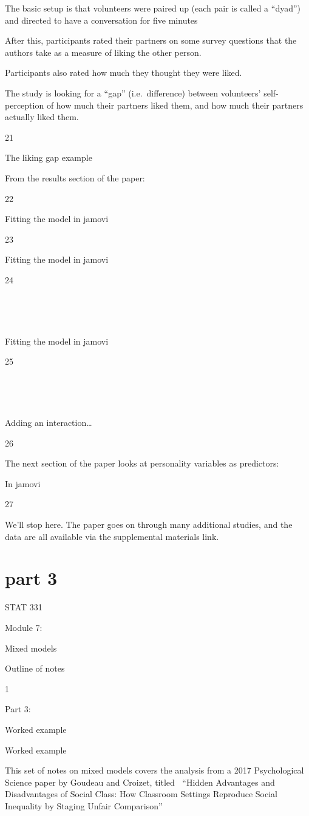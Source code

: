 \documentclass[
  letterpaper,
  DIV=11,
  numbers=noendperiod]{scrreprt}
\begin{document}
The basic setup is that volunteers were paired up (each pair is called a
``dyad'') and directed to have a conversation for five minutes

After this, participants rated their partners on some survey questions
that the authors take as a measure of liking the other person.

Participants also rated how much they thought they were liked.

The study is looking for a ``gap'' (i.e.~difference) between volunteers'
self-perception of how much their partners liked them, and how much
their partners actually liked them.

21

The liking gap example

From the results section of the paper:

22

Fitting the model in jamovi

23

Fitting the model in jamovi

24

~

~

Fitting the model in jamovi

25

~

~

Adding an interaction\ldots{}

26

The next section of the paper looks at personality variables as
predictors:

In jamovi

27

We'll stop here. The paper goes on through many additional studies, and
the data are all available via the supplemental materials link.

\hypertarget{part-3}{%
\section{part 3}\label{part-3}}

STAT 331

Module 7:

Mixed models

Outline of notes

1

Part 3:

Worked example 

Worked example

This set of notes on mixed models covers the analysis from a 2017
Psychological Science paper by Goudeau and Croizet, titled ``Hidden
Advantages and Disadvantages of Social Class: How Classroom Settings
Reproduce Social Inequality by Staging Unfair Comparison''
\end{document}
